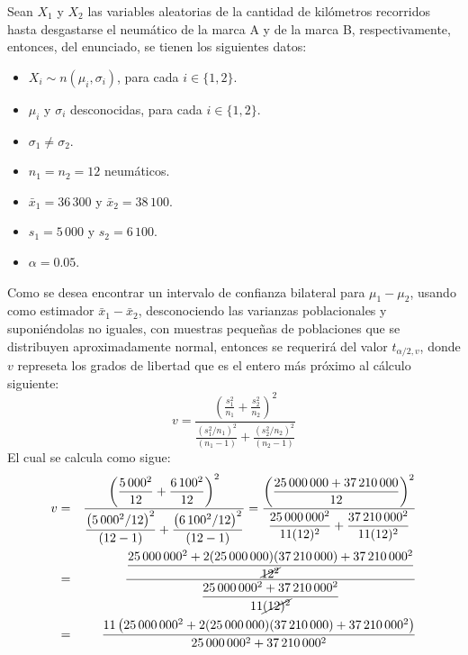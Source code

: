 \begin{solucion}
 Sean $X_1$ y $X_2$ las variables aleatorias de la cantidad de kil\'ometros recorridos hasta desgastarse el neum\'atico de la marca A y de la marca B, respectivamente, entonces, del enunciado, se tienen los siguientes datos:
 \begin{itemize}
  \item $X_i \sim n(\mu_i, \sigma_i)$, para cada $i \in \{ 1, 2 \}$.
  \item $\mu_i$ y $\sigma_i$ desconocidas, para cada $i \in \{ 1, 2 \}$.
  \item $\sigma_1 \neq \sigma_2$.
  \item $n_1 = n_2 = 12$ neum\'aticos.
  \item $\bar{x}_1 = 36\,300$ y $\bar{x}_2 = 38\,100$.
  \item $s_1 = 5\,000$ y $s_2 = 6\,100$.
  \item $\alpha = 0.05$.
 \end{itemize}
 Como se desea encontrar un intervalo de confianza bilateral para $\mu_1 - \mu_2$, usando como estimador $\bar{x}_1 - \bar{x}_2$, desconociendo las varianzas poblacionales y suponi\'endolas no iguales, con muestras peque\~nas de poblaciones que se distribuyen aproximadamente normal, entonces se requerir\'a del valor $t_{\alpha/2,v}$, donde $v$ represeta los grados  de libertad que es el entero m\'as pr\'oximo al c\'alculo siguiente:
 \begin{equation*}
  v = \frac{ \displaystyle{ \left( \frac{s_1^2}{n_1} + \frac{s_2^2}{n_2} \right)^2 } }{ \displaystyle{ \frac{ \left( s_1^2/n_1 \right)^2 }{\left( n_1 - 1 \right)} + \frac{ \left( s_2^2/n_2 \right)^2 }{\left( n_2  - 1\right)} }}
 \end{equation*}
 El cual se calcula como sigue: 
 \begin{eqnarray*}
  v & = & \frac{ \displaystyle{ \left( \frac{ 5\,000^2 }{12} + \frac{ 6\,100^2}{12} \right)^2 } }{ \displaystyle{ \frac{ \left( 5\,000^2/ 12 \right)^2 }{\left( 12 - 1 \right)} + \frac{ \left( 6\,100^2/12 \right)^2 }{\left( 12  - 1\right)}  }} = \frac{ \displaystyle{ \left( \frac{ 25\,000\,000 + 37\,210\,000 }{12} \right)^2 } }{ \displaystyle{ \frac{ 25\,000\,000^2 }{11(12)^2} + \frac{ 37\,210\,000^2 }{11(12)^2}  }} \\
  & = & \frac{ \displaystyle{ \frac{ 25\,000\,000^2 + 2(25\,000\,000)(37\,210\,000) + 37\,210\,000^2 }{\cancel{12^2}} } }{ \displaystyle{ \frac{ 25\,000\,000^2 + 37\,210\,000^2 }{11\cancel{(12)^2}} }} \\
  & = & \frac{ 11\left( 25\,000\,000^2 + 2(25\,000\,000)(37\,210\,000) + 37\,210\,000^2 \right) }{ 25\,000\,000^2 + 37\,210\,000^2 } \\

\end{eqnarray*}
\end{solucion}
